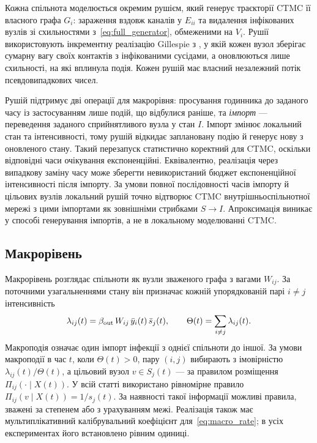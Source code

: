 Кожна спільнота моделюється окремим рушієм, який генерує траєкторії CTMC її власного графа $G_i$: зараження вздовж каналів у $E_{ii}$ та видалення інфікованих вузлів зі схильностями з~\eqref{eq:full_generator}, обмеженими на $V_i$. Рушії використовують інкрементну реалізацію Gillespie з \citet{kuryliak2025simulating}, у якій кожен вузол зберігає сумарну вагу своїх контактів з інфікованими сусідами, а оновлюються лише схильності, на які вплинула подія. Кожен рушій має власний незалежний потік псевдовипадкових чисел.

Рушій підтримує дві операції для макрорівня: просування годинника до заданого часу із застосуванням лише подій, що відбулися раніше, та \emph{імпорт} --- переведення заданого сприйнятливого вузла у стан $I$. Імпорт змінює локальний стан та інтенсивності, тому рушій відкидає заплановану подію й генерує нову з оновленого стану. Такий перезапуск статистично коректний для CTMC, оскільки відповідні часи очікування експоненційні. Еквівалентно, реалізація через випадкову заміну часу може зберегти невикористаний бюджет експоненційної інтенсивності після імпорту. За умови повної послідовності часів імпорту й цільових вузлів локальний рушій точно відтворює CTMC внутрішньоспільнотної мережі з цими імпортами як зовнішніми стрибками $S\to I$. Апроксимація виникає у способі генерування імпортів, а не в локальному моделюванні CTMC.

\subsection{Макрорівень}
\label{sec:macro}

Макрорівень розглядає спільноти як вузли зваженого графа з вагами $W_{ij}$. За поточними узагальненнями стану він призначає кожній упорядкованій парі $i\neq j$ інтенсивність
\begin{equation}
\label{eq:macro_rate}
\lambda_{ij}(t)=\beta_{\mathrm{out}}\,W_{ij}\,\bar{y}_i(t)\,\bar{s}_j(t),
\qquad
\Theta(t)=\sum_{i\neq j}\lambda_{ij}(t).
\end{equation}
Макроподія означає один імпорт інфекції з однієї спільноти до іншої. За умови макроподії в час $t$, коли $\Theta(t)>0$, пару $(i,j)$ вибирають з імовірністю $\lambda_{ij}(t)/\Theta(t)$, а цільовий вузол $v\in S_j(t)$ --- за правилом розміщення $\Pi_{ij}(\cdot\mid X(t))$. У всій статті використано рівномірне правило $\Pi_{ij}(v\mid X(t))=1/s_j(t)$. За наявності такої інформації можливі правила, зважені за степенем або з урахуванням межі. Реалізація також має мультиплікативний калібрувальний коефіцієнт для~\eqref{eq:macro_rate}; в усіх експериментах його встановлено рівним одиниці.

